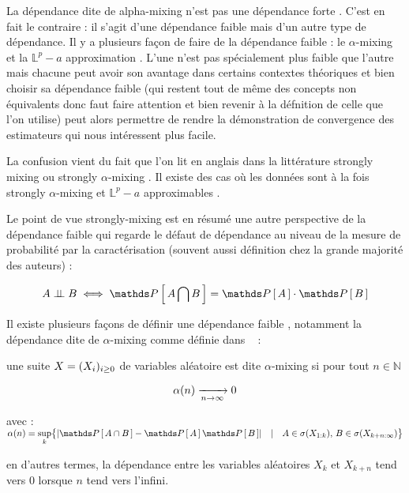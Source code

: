 \begin{leftbar}
    La dépendance dite de \og alpha-mixing \fg n'est pas une dépendance \og forte \fg. C'est en fait le contraire : il s'agit d'une dépendance faible mais d'un autre type de dépendance. Il y a plusieurs façon de faire de la dépendance faible : le \og $\alpha$-mixing \fg et la \og $\mathds L^p-a$ approximation \fg. L'une n'est pas spécialement plus faible que l'autre mais chacune peut avoir son avantage dans certains contextes théoriques et bien choisir sa dépendance faible (qui restent tout de même des concepts non équivalents donc faut faire attention et bien revenir à la défnition de celle que l'on utilise) peut alors permettre de rendre la démonstration de convergence des estimateurs qui nous intéressent plus facile. 

    La confusion vient du fait que l'on lit en anglais dans la littérature \og strongly mixing \fg ou \og strongly $\alpha$-mixing \fg. Il existe des cas où les données sont à la fois \og strongly $\alpha$-mixing \fg et \og $\mathds L^p-a$ approximables \fg.

    \noindent Le point de vue \og strongly-mixing \fg est en résumé une autre perspective de la dépendance faible qui regarde le défaut de dépendance au niveau de la mesure de probabilité par la caractérisation (souvent aussi définition chez la grande majorité des auteurs) :

    \begin{equation*}
        A \indep B \iff \proba{ A \bigcap B } = \proba A \cdot \proba B  
    \end{equation*}
\end{leftbar}

Il existe plusieurs façons de définir une \og dépendance faible \fg, notamment la dépendance dite de \og $\alpha$-mixing \fg comme définie dans ~\cite{estimation-dependent-strong-mixing} \edited :


\begin{definition*}

    une suite $X = ( {X}_{i})_{i \geq 0}$ de variables aléatoire est dite $\alpha$-mixing si pour tout $n \in \mathds N$


    $$
        \alpha(n) \xrightarrow[ n \rightarrow \infty ]{} 0
    $$

    avec : $\alpha(n) = \sup\limits_k \bigl\{ \lvert \proba{A \cap B} - \proba{A}\proba{B} \rvert \quad | \quad A \in \sigma( X_{1:k} ), \, B \in \sigma(X_{k+n : \infty}) \bigr\}$

    en d'autres termes, la \og dépendance \fg {} entre les variables aléatoires $X_k$ et $X_{k+n}$ tend vers 0 lorsque $n$ tend vers l'infini.
\end{definition*}

